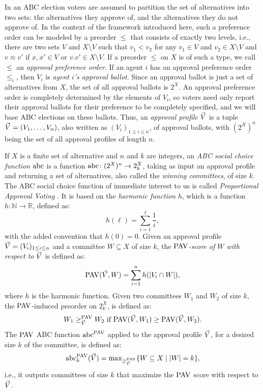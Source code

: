 In an ABC election voters are assumed to partition
the set of alternatives into two sets: the alternatives they approve of, 
and the alternatives they do not approve of.
In the context of the framework introduced here, such a preference
order can be modeled by a preorder $\le$ that consists of exactly two levels,
i.e., there are two sets $V$ and $X\setminus V$ such that
$v_1<v_2$ for any $v_1\in V$ and $v_2\in X\setminus V$
and $v\approx v'$ if $x,x'\in V$ or $v.v'\in X\setminus V$.
If a preorder $\le$ on $X$ is of such a type, 
we call $\le$ an \emph{approval preference order}.
If an agent $i$ has an approval preference order $\le_i$, 
then $V_i$ is \emph{agent $i$'s approval ballot}. 
Since an approval ballot is just a set of alternatives from $X$,
the set of all approval ballots is $2^{X}$.
An approval preference order is completely determined by the elements of $V_i$,
so voters need only report their approval ballots for their preference to be 
completely specified, and we will base ABC elections on these ballots.
Thus, an \emph{approval profile $\vec{V}$} is a tuple 
$\vec{V}=(V_1,\dots,V_n)$, also written as $(V_i)_{1\le i\le n}$,
of approval ballots, with $(2^X)^n$ being the set of all approval profiles of length $n$.

If $X$ is a finite set of alternative and $n$ and $k$ are integers, 
an \emph{ABC social choice function ${\operatorname{abc}}$} is a function 
${\operatorname{abc}}\colon (2^X)^{n}\rightarrow 2_k^X$,
taking as input an approval profile and returning a set of alternatives,
also called the \emph{winning committees}, of size $k$.
The ABC social choice function of immediate interest to us 
is called \emph{Proportional Approval Voting} \cite{Thiele95}.
It is based on the \emph{harmonic function $h$}, which is a function 
$h\colon\mathbb{N}\rightarrow\mathbb{R}$,
defined as:
$$
	h(\ell) = \sum_{i=1}^{\ell}\frac{1}{i}, 
$$
with the added convention that $h(0)=0$.
Given an approval profile $\vec{V}=(V_i)_{1\le i\le n}$
and a committee $W\subseteq X$ of size $k$, 
the \emph{$\mathrm{PAV}$-score of $W$ with respect to $\vec{V}$} is
defined as:
$$
	\mathrm{PAV}(\vec{V},W)=\sum_{i=1}^n h(|V_i\cap W|),
$$
where $h$ is the harmonic function.
Given two committees $W_1$ and $W_2$ of size $k$,
the $\mathrm{PAV}$-induced preorder on $2_k^{X}$, is defined as:
$$
	W_1\ge^{\mathrm{PAV}}_{\vec{V}}W_2~\text{if}~\mathrm{PAV}(\vec{V},W_1)\ge\mathrm{PAV}(\vec{V},W_2).
$$
The $\mathrm{PAV}$ ABC function ${\operatorname{abc}}^{\mathrm{PAV}}$ applied to the approval profile $\vec{V}$, 
for a desired size $k$ of the committee, is defined as:
$$
	{\operatorname{abc}}^{\mathrm{PAV}}_k(\vec{V})={\operatorname{max}}_{\ge^{\mathrm{PAV}}_{\vec{V}}}\{W\subseteq X\mid |W|=k\},
$$
i.e., it outputs committees of size $k$ that maximize the 
$\mathrm{PAV}$ score with respect to $\vec{V}$.

